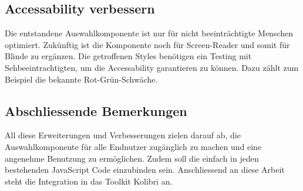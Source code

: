 \subsection{Accessability verbessern}
\label{sec:betterAccessability}

Die entstandene Auswahlkomponente ist nur für nicht beeinträchtigte Menschen optimiert.
Zukünftig ist die Komponente noch für Screen-Reader und somit für Blinde zu ergänzen.
Die getroffenen Styles benötigen ein Testing mit Sehbeeintrachtigten, um die Accessability garantieren zu können.
Dazu zählt zum Beispiel die bekannte Rot-Grün-Schwäche.


\subsection{Abschliessende Bemerkungen}
\label{sec:endSumup}

All diese Erweiterungen und Verbesserungen zielen darauf ab, die Auswahlkomponente für alle Endnutzer zugänglich zu machen und eine angenehme Benutzung zu ermöglichen.
Zudem soll die  einfach in jeden bestehenden JavaScript Code einzubinden sein. 
Anschliessend an diese Arbeit steht die Integration in das Toolkit Kolibri an.
